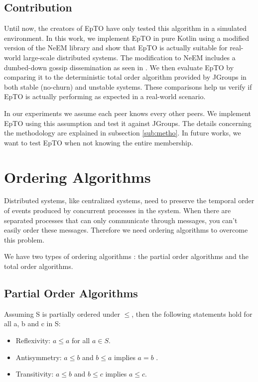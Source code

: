 \documentclass[10pt,conference,a4paper]{IEEEtran}
\begin{document}
\subsection{Contribution}
Until now, the creators of EpTO have only tested this algorithm in a simulated environment. In this work, we implement EpTO in pure Kotlin using a modified version of the NeEM library \autocite{neem} and show that EpTO is actually suitable for real-world large-scale distributed systems. The modification to NeEM includes a dumbed-down gossip dissemination as seen in \autocite{matos2015epto}. We then evaluate EpTO by comparing it to the deterministic total order algorithm provided by JGroups  \autocite{jgroups} in both stable (no-churn) and unstable systems. These comparisons help us verify if EpTO is actually performing as expected in a real-world scenario.
\par
In our experiments we assume each peer knows every other peers. We implement EpTO using this assumption and test it against JGroups. The details concerning the methodology are explained in subsection \ref{sub:metho}. In future works, we want to test EpTO when not knowing the entire membership.

\section{Ordering Algorithms}
Distributed systems, like centralized systems, need to preserve the temporal order of events produced by concurrent processes in the system. When there are separated processes that can only communicate through messages, you can’t easily order these messages.
Therefore we need ordering algorithms to overcome this problem.
\par
We have two types of ordering algorithms \autocite{lamport1978time}: the partial order algorithms and the total order algorithms.
\subsection{Partial Order Algorithms}
Assuming S is partially ordered under $\leq$, then the following statements hold for all a, b and c in S:
\begin{itemize}
	\item Reflexivity: $a \leq a$ for all $a \in S$.
	\item Antisymmetry: $a \leq b$ and $b \leq a$ implies $a=b$ .
	\item Transitivity: $a \leq b$  and $b \leq c$  implies $a \leq c$.
\end{itemize}
\end{document}
